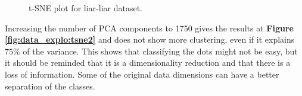 \begin{figure}[h]
  \centering
  \caption{t-SNE plot for liar-liar dataset.}
  \label{fig:data_explo:tsne1}
\end{figure}
Increasing the number of PCA components to 1750 gives the results at \textbf{Figure \ref{fig:data_explo:tsne2}} and does not show more clustering, even if it explains $75\%$ of the variance. This shows that classifying the dots might not be easy, but it should be reminded that it is a dimensionality reduction and that there is a loss of information. Some of the original data dimensions can have a better separation of the classes. \\


